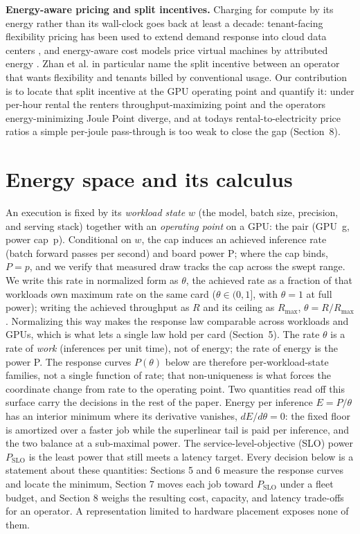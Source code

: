 \textbf{Energy-aware pricing and split incentives.} Charging for compute by its energy rather than its wall-clock
goes back at least a decade: tenant-facing flexibility pricing has been used to extend demand response into cloud data
centers \cite{ref56}, and energy-aware cost models price virtual machines by attributed energy \cite{ref57, ref58}. Zhan et al.
\cite{ref56} in particular name the split incentive between an operator that wants flexibility and tenants billed by
conventional usage. Our contribution is to locate that split incentive at the GPU operating point and quantify
it: under per-hour rental the renter\textquotesingle s throughput-maximizing point and the operator\textquotesingle s energy-minimizing Joule Point diverge, and at today\textquotesingle s rental-to-electricity price ratios a simple per-joule pass-through is too weak to
close the gap (Section~8).

\section{Energy space and its calculus}\label{energy-space-and-its-calculus}

An execution is fixed by its \emph{workload state} {\(w\)} (the model, batch size, precision,
and serving stack) together with an \emph{operating point} on a GPU: the pair (GPU~g, power cap~p).
Conditional on {\(w\)}, the cap induces an achieved inference rate (batch forward passes per
second) and board power P; where the cap binds, {\(P=p\)}, and we verify that measured draw tracks
the cap across the swept range. We write this rate in normalized form as {\(\theta\)}, the achieved
rate as a fraction of that workload\textquotesingle s own maximum rate on the same card ({\(\theta\in(0,1]\)},
with {\(\theta=1\)} at full power); writing the achieved throughput as {\(R\)} and its ceiling as
{\(R_{\max}\)}, {\(\theta=R/R_{\max}\)}. Normalizing this way makes the response law comparable across workloads and
GPUs, which is what lets a single law hold per card (Section~5). The rate {\(\theta\)} is a
rate of \emph{work} (inferences per unit time), not of energy; the rate of energy is the power P. The response curves {\(P(\theta)\)} below are therefore
per-workload-state families, not a single function of rate; that non-uniqueness is what forces the coordinate
change from rate to the operating point. Two quantities read off this surface carry the decisions in the rest of
the paper. Energy per inference {\(E=P/\theta\)} has an interior minimum where its derivative
vanishes, {\(dE/d\theta=0\)}: the fixed floor is amortized over a faster job while the superlinear tail
is paid per inference, and the two balance at a sub-maximal power. The service-level-objective (SLO) power
{\(P_{\mathrm{SLO}}\)} is the least power that still meets a latency target. Every decision below is a
statement about these quantities: Sections 5 and 6 measure the response curves and locate the minimum,
Section 7 moves each job toward {\(P_{\mathrm{SLO}}\)} under a fleet budget, and Section 8 weighs the
resulting cost, capacity, and latency trade-offs for an operator. A representation limited to hardware placement exposes none of them.

